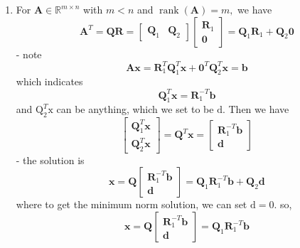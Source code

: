 \documentclass[english,onecolumn]{IEEEtran}
\begin{document}
\begin{enumerate}
\item
For $\mathbf{A} \in \mathbb{R}^{m \times n}$ with $m<n$ and $\operatorname{rank}(\mathbf{A})=m,$ we have
$$
\mathbf{A}^{T}=\mathbf{Q} \mathbf{R}=\left[\begin{array}{ll}
\mathbf{Q}_{1} & \mathbf{Q}_{2}
\end{array}\right]\left[\begin{array}{c}
\mathbf{R}_{1} \\
\mathbf{0}
\end{array}\right]=\mathbf{Q}_{1} \mathbf{R}_{1}+\mathbf{Q}_{2} \mathbf{0}
$$
- note
$$
\mathbf{A} \mathbf{x}=\mathbf{R}_{1}^{T} \mathbf{Q}_{1}^{T} \mathbf{x}+\mathbf{0}^{T} \mathbf{Q}_{2}^{T} \mathbf{x}=\mathbf{b}
$$
which indicates
$$
\mathbf{Q}_{1}^{T} \mathbf{x}=\mathbf{R}_{1}^{-T} \mathbf{b}
$$
and $\mathrm{Q}_{2}^{T} \mathrm{x}$ can be anything, which we set to be $\mathrm{d}$. Then we have
$$
\left[\begin{array}{c}
\mathbf{Q}_{1}^{T} \mathbf{x} \\
\mathbf{Q}_{2}^{T} \mathbf{x}
\end{array}\right]=\mathbf{Q}^{T} \mathbf{x}=\left[\begin{array}{c}
\mathbf{R}_{1}^{-T} \mathbf{b} \\
\mathbf{d}
\end{array}\right]
$$
- the solution is
$$
\mathbf{x}=\mathbf{Q}\left[\begin{array}{c}
\mathbf{R}_{1}^{-T} \mathbf{b} \\
\mathbf{d}
\end{array}\right]=\mathbf{Q}_{1} \mathbf{R}_{1}^{-T} \mathbf{b}+\mathbf{Q}_{2} \mathbf{d}
$$
where to get the minimum norm solution, we can set $\mathrm{d}=0$.
so, $$
\mathbf{x}=\mathbf{Q}\left[\begin{array}{c}
\mathbf{R}_{1}^{-T} \mathbf{b} \\
\mathbf{d}
\end{array}\right]=\mathbf{Q}_{1} \mathbf{R}_{1}^{-T} \mathbf{b}
$$

\end{enumerate}
\end{document}
